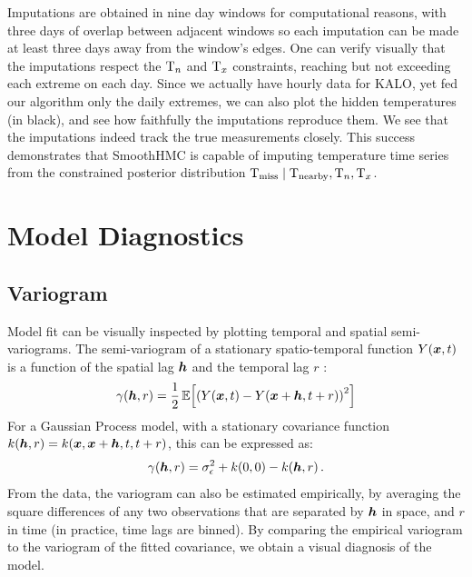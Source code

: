 \documentclass[12pt]{article}
\begin{document}
Imputations are obtained in nine day windows for computational reasons, with three days of overlap between adjacent windows so each imputation can be made at least three days away from the window's edges.
One can verify visually that the imputations respect the \(\mathrm{T}_{n}\) and \(\mathrm{T}_{x}\) constraints, reaching but not exceeding each extreme on each day.
Since we actually have hourly data for KALO, yet fed our algorithm only the daily extremes, we can also plot the hidden temperatures (in black), and see how faithfully the imputations reproduce them.
We see that the imputations indeed track the true measurements closely.
This success demonstrates that SmoothHMC is capable of imputing temperature time series from the constrained posterior distribution \(\mathrm{T}_{\mathrm{miss}} \mid \mathrm{T}_{\mathrm{nearby}}, \mathrm{T}_{n}, \mathrm{T}_{x}\).

\section{Model Diagnostics}
\label{sec:diagnostics}

\subsection{Variogram}\label{variogram}

Model fit can be visually inspected by plotting temporal and spatial semi-variograms. 
The semi-variogram  of a stationary spatio-temporal function \(Y(\bm{x},t)\) is a function of the spatial lag \(\bm{h}\) and the temporal lag \(r\) \citep[see for example][chapter 6]{sherman2011spatial}:
\begin{equation}
    \gamma\del{\hvec,r} = \frac{1}{2} \E\sbr{\del{Y\del{\xvec,t}-Y\del{\xvec+\hvec,t+r}}^2}
\end{equation}
For a Gaussian Process model, with a stationary covariance function \(k(\bm{h},r)=k(\bm{x},\bm{x}+\bm{h},t,t+r)\), this can be expressed as:
\begin{equation}
    \label{eq:gp_variogram}
    \gamma\del{\hvec,r} = \sigman^2 + k\del{0,0} - k(\hvec,r)\,.
\end{equation}
From the data, the variogram can also be estimated empirically, by averaging the square differences of any two observations that are separated by \(\bm{h}\) in space, and \(r\) in time (in practice, time lags are binned).
By comparing the empirical variogram to the variogram of the fitted covariance, 
we obtain a visual diagnosis of the model.
\end{document}
